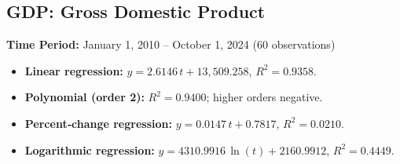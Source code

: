 \documentclass[11pt,a4paper]{article}
\begin{document}
\clearpage
\subsection{GDP: Gross Domestic Product}
\textbf{Time Period:} January 1, 2010 – October 1, 2024 (60 observations)

\begin{itemize}
  \item \textbf{Linear regression:} \(y = 2.6146\,t + 13{,}509.258\), \(R^2 = 0.9358\).
  \item \textbf{Polynomial (order 2):} \(R^2 = 0.9400\); higher orders negative.
  \item \textbf{Percent‐change regression:} \(y = 0.0147\,t + 0.7817\), \(R^2 = 0.0210\).
  \item \textbf{Logarithmic regression:} \(y = 4310.9916\,\ln(t) + 2160.9912\), \(R^2 = 0.4449\).
\end{itemize}
\end{document}
